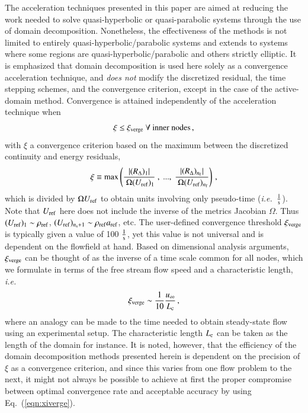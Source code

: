 \documentclass{warpdoc}
\newcommand{\nf}{{n_{\rm f}}}
\newcommand{\ns}{{n_{\rm s}}}
\newcommand{\xiverge}{{\xi_{\rm verge}}}
\newcommand{\ie}{{\it i.e.}~}
\begin{document}
The acceleration techniques presented in this paper are aimed at reducing
the work needed to solve quasi-hyperbolic or quasi-parabolic systems through the use
of domain decomposition. Nonetheless, the effectiveness of the methods
is not limited to entirely quasi-hyperbolic/parabolic systems and extends to
systems where some regions are quasi-hyperbolic/parabolic
and others strictly elliptic.
It is emphasized that domain decomposition is used here solely as a convergence
acceleration technique, and \emph{does not} modify the discretized residual, the
time stepping schemes, and the convergence criterion, except in the case
of the active-domain method. Convergence is attained
independently of the acceleration technique when
%
\begin{equation}
  \xi \leq \xiverge ~\forall~ {\rm inner~nodes} \, ,
  \label{eqn:convergence_criterion}
\end{equation}
%
with $\xi$ a convergence criterion based on the
maximum between the discretized continuity and energy residuals,
%
\begin{equation}
  \xi\equiv {\rm max} \left(
        \frac{|(R_\Delta)_1|}{ ~\Omega  (U_{\rm ref})_1}~,~...,~
        \frac{|(R_\Delta)_\nf|}{ ~\Omega (U_{\rm ref})_\nf}
  \right) \, ,
\label{eqn:xi}
\end{equation}
%
which is divided by $\Omega U_{\rm ref}$ to obtain units involving only pseudo-time (\ie $\frac{1}{\rm s}$). Note that $U_{\rm ref}$ here does not include the inverse of the metrics Jacobian $\Omega$. Thus $(U_{\rm ref})_1 \sim \rho_{\rm ref}$, $(U_{\rm ref})_{\ns+1}\sim \rho_{\rm ref} a_{\rm ref}$, etc.  
The user-defined convergence threshold $\xiverge$ is typically given a value
of 100 $\frac{1}{\rm s}$, yet this value is not universal
and is dependent on the flowfield at hand.
Based on dimensional analysis arguments, $\xiverge$ can be thought of as the inverse of
a time scale common for all nodes, which we formulate in terms of the free stream
flow speed and a characteristic length, \ie
%
\begin{equation}
 \xiverge \sim \frac{1}{10} \frac{u_\infty}{L_{\rm c}} \, ,
 \label{eqn:xiverge}
\end{equation}
%
where an analogy can be made to the time needed to obtain steady-state
flow using an experimental setup. The characteristic length $L_{\rm c}$
can be taken as the length of the domain for instance.
It is noted, however, that the efficiency of the domain decomposition
methods presented herein is dependent on the precision of $\xi$ as a
convergence criterion, and since this varies from one flow problem to the next,
it might not always be possible to achieve at first the proper compromise between
optimal convergence rate and acceptable accuracy by using Eq.~(\ref{eqn:xiverge}).
\end{document}
